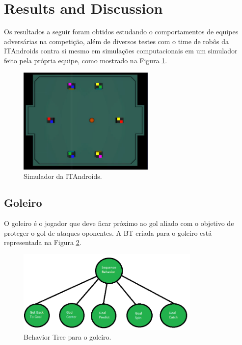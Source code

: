 \documentclass[conference]{IEEEtran}
\begin{document}
\section{Results and Discussion}

Os resultados a seguir foram obtidos estudando o comportamentos de equipes adversárias na competição, além de diversos testes com o time de robôs da ITAndroids contra si mesmo em simulações computacionais em um simulador feito pela própria equipe, como mostrado na Figura \ref{fig:simulator}.

\begin{figure}[H]
	\centering
	\includegraphics[width=0.6\textwidth]{figures/SimulatorWithoutButtons.png}
	\caption{Simulador da ITAndroids.}
	\label{fig:simulator}
\end{figure}

\subsection{Goleiro}

O goleiro é o jogador que deve ficar próximo ao gol aliado com o objetivo de proteger o gol de ataques oponentes. 
A BT criada para o goleiro está representada na Figura \ref{fig:goalier_bt}.

\begin{figure}[H]
	\centering
	\includegraphics[width=0.8\textwidth]{figures/Goalier_BT.png}
   	\caption{Behavior Tree para o goleiro.} \label{fig:goalier_bt}
\end{figure}
\end{document}
